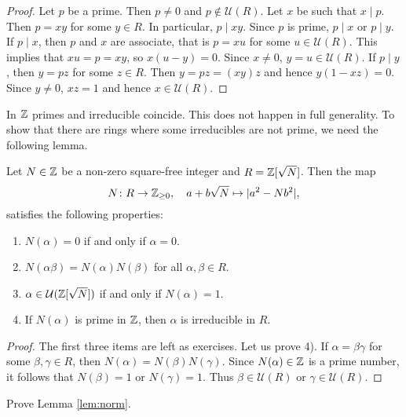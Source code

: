 \begin{proof}
	Let $p$ be a prime. Then $p\ne 0$ and $p\not\in\mathcal{U}(R)$. Let $x$ be such that
	$x\mid p$. Then $p=xy$ for some $y\in R$. In particular, $p\mid xy$. 
	Since $p$ is prime, $p\mid x$ or $p\mid y$. If $p\mid x$, then
	$p$ and $x$ are associate, that is $p=xu$ for some $u\in\mathcal{U}(R)$.
	This implies that $xu=p=xy$, so $x(u-y)=0$. Since $x\ne 0$, 
	$y=u\in\mathcal{U}(R)$. 
	If $p\mid y$, then $y=pz$ for some $z\in R$. Then
	$y=pz=(xy)z$ and hence $y(1-xz)=0$. Since $y\ne 0$, 
	$xz=1$ and hence $x\in\mathcal{U}(R)$. 
\end{proof}

In $\mathbb{Z}$ primes and irreducible coincide. 
This does not happen in full generality. 
To show that there are rings where some irreducibles are not prime, 
we need the following lemma. 

\begin{lemma}
\label{lem:norm}
Let $N\in\mathbb{Z}$ be a non-zero square-free integer and $R=\mathbb{Z}[\sqrt{N}]$. Then 
the map 
\[
	N\colon R\to\mathbb{Z}_{\geq0},
\quad a+b\sqrt{N}\mapsto 
|a^2-Nb^2|,
\]
satisfies the following properties:
\begin{enumerate}
	\item $N(\alpha)=0$ if and only if $\alpha=0$. 
	\item $N(\alpha\beta)=N(\alpha)N(\beta)$ for all $\alpha,\beta\in R$. 
	\item $\alpha\in\mathcal{U}(\mathbb{Z}[\sqrt{N}])$ if and only if $N(\alpha)=1$. 
	\item If $N(\alpha)$ is prime in $\mathbb{Z}$, then $\alpha$ is irreducible in $R$. 
\end{enumerate}	
\end{lemma}

\begin{proof}
	The first three items are left as exercises. Let us prove 4). 
	If $\alpha=\beta\gamma$ for some $\beta,\gamma\in R$, then
	$N(\alpha)=N(\beta)N(\gamma)$. Since $N(\alpha)\in\mathbb{Z}$ is a prime number, it follows that
	$N(\beta)=1$ or $N(\gamma)=1$. Thus $\beta\in\mathcal{U}(R)$ or $\gamma\in\mathcal{U}(R)$. 	
\end{proof}

\begin{exercise}
    Prove Lemma \ref{lem:norm}.
\end{exercise}

